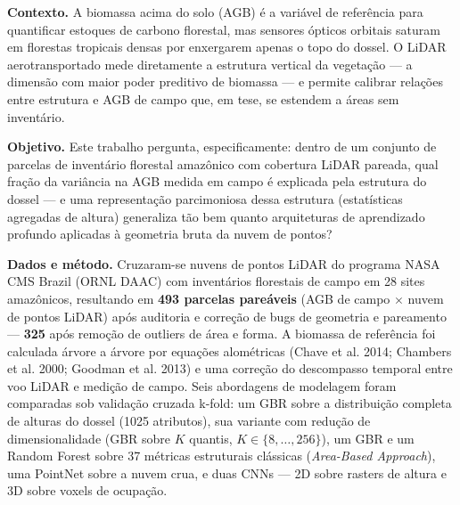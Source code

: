 \documentclass[article,12pt,oneside,a4paper]{abntex2}
\begin{document}
\maketitle

\begin{resumoumacoluna}
\noindent
\textbf{Contexto.} A biomassa acima do solo (AGB) é a variável de referência
para quantificar estoques de carbono florestal, mas sensores ópticos orbitais
saturam em florestas tropicais densas por enxergarem apenas o topo do dossel.
O LiDAR aerotransportado mede diretamente a estrutura vertical da vegetação ---
a dimensão com maior poder preditivo de biomassa --- e permite calibrar relações
entre estrutura e AGB de campo que, em tese, se estendem a áreas sem inventário.

\textbf{Objetivo.} Este trabalho pergunta, especificamente: dentro de um
conjunto de parcelas de inventário florestal amazônico com cobertura LiDAR
pareada, qual fração da variância na AGB medida em campo é explicada pela
estrutura do dossel --- e uma representação parcimoniosa dessa estrutura
(estatísticas agregadas de altura) generaliza tão bem quanto arquiteturas de
aprendizado profundo aplicadas à geometria bruta da nuvem de pontos?

\textbf{Dados e método.} Cruzaram-se nuvens de pontos LiDAR do programa NASA CMS
Brazil (ORNL DAAC) com inventários florestais de campo em 28 sites amazônicos,
resultando em \textbf{493 parcelas pareáveis} (AGB de campo $\times$ nuvem de
pontos LiDAR) após auditoria e correção de bugs de geometria e pareamento ---
\textbf{325} após remoção de outliers de área e forma. A biomassa de referência
foi calculada árvore a árvore por equações alométricas (Chave et al. 2014;
Chambers et al. 2000; Goodman et al. 2013) e uma correção do descompasso
temporal entre voo LiDAR e medição de campo. Seis abordagens de modelagem foram
comparadas sob validação cruzada k-fold: um GBR sobre a distribuição completa de
alturas do dossel (1025 atributos), sua variante com redução de dimensionalidade
(GBR sobre $K$ quantis, $K \in \{8,\dots,256\}$), um GBR e um Random Forest sobre
37 métricas estruturais clássicas (\textit{Area-Based Approach}), uma PointNet
sobre a nuvem crua, e duas CNNs --- 2D sobre rasters de altura e 3D sobre voxels
de ocupação.


\end{resumoumacoluna}
\end{document}
